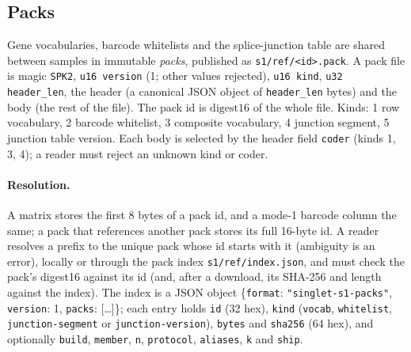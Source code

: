 \subsection{Packs}
\label{spec:packs}
Gene vocabularies, barcode whitelists and the splice-junction table are shared between samples in immutable
\emph{packs}, published as \texttt{s1/ref/<id>.pack}. A pack file is magic \texttt{SPK2}, \texttt{u16 version} (1; other
values rejected), \texttt{u16 kind}, \texttt{u32 header\_len}, the header (a canonical JSON object of
\texttt{header\_len} bytes) and the body (the rest of the file). The pack id is $\mathrm{digest16}$ of the whole file.
Kinds: 1 row vocabulary, 2 barcode whitelist, 3 composite vocabulary, 4 junction segment, 5 junction table version.
Each body is selected by the header field \texttt{coder} (kinds 1, 3, 4); a reader must reject an unknown kind or coder.

\paragraph{Resolution.}
A matrix stores the first 8 bytes of a pack id, and a mode-1 barcode column the same; a pack that references another
pack stores its full 16-byte id. A reader resolves a prefix to the unique pack whose id starts with it (ambiguity is an
error), locally or through the pack index \texttt{s1/ref/index.json}, and must check the pack's digest16 against its id
(and, after a download, its SHA-256 and length against the index). The index is a JSON object \{\texttt{format}:
\texttt{"singlet-s1-packs"}, \texttt{version}: 1, \texttt{packs}: [\dots]\}; each entry holds \texttt{id} (32 hex),
\texttt{kind} (\texttt{vocab}, \texttt{whitelist}, \texttt{junction-segment} or \texttt{junction-version}),
\texttt{bytes} and \texttt{sha256} (64 hex), and optionally \texttt{build}, \texttt{member}, \texttt{n},
\texttt{protocol}, \texttt{aliases}, \texttt{k} and \texttt{ship}.

